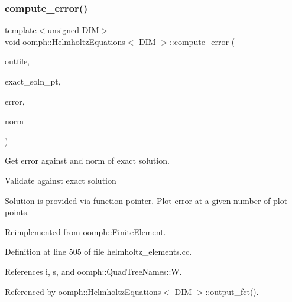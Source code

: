 \subsubsection{\texorpdfstring{compute\+\_\+error()}{compute\_error()}\hspace{0.1cm}{\footnotesize\ttfamily [1/2]}}
{\footnotesize\ttfamily template$<$unsigned D\+IM$>$ \\
void \hyperlink{classoomph_1_1HelmholtzEquations}{oomph\+::\+Helmholtz\+Equations}$<$ D\+IM $>$\+::compute\+\_\+error (\begin{DoxyParamCaption}\item[{std\+::ostream \&}]{outfile,  }\item[{\hyperlink{classoomph_1_1FiniteElement_a690fd33af26cc3e84f39bba6d5a85202}{Finite\+Element\+::\+Steady\+Exact\+Solution\+Fct\+Pt}}]{exact\+\_\+soln\+\_\+pt,  }\item[{double \&}]{error,  }\item[{double \&}]{norm }\end{DoxyParamCaption})\hspace{0.3cm}{\ttfamily [virtual]}}



Get error against and norm of exact solution. 

Validate against exact solution

Solution is provided via function pointer. Plot error at a given number of plot points. 

Reimplemented from \hyperlink{classoomph_1_1FiniteElement_a73c79a1f1e5b1d334757812a6bbd58ff}{oomph\+::\+Finite\+Element}.



Definition at line 505 of file helmholtz\+\_\+elements.\+cc.



References i, s, and oomph\+::\+Quad\+Tree\+Names\+::W.



Referenced by oomph\+::\+Helmholtz\+Equations$<$ D\+I\+M $>$\+::output\+\_\+fct().

\mbox{\label{classoomph_1_1HelmholtzEquations_ab54feaaaca82a4cf112da74386fe713f}} 
